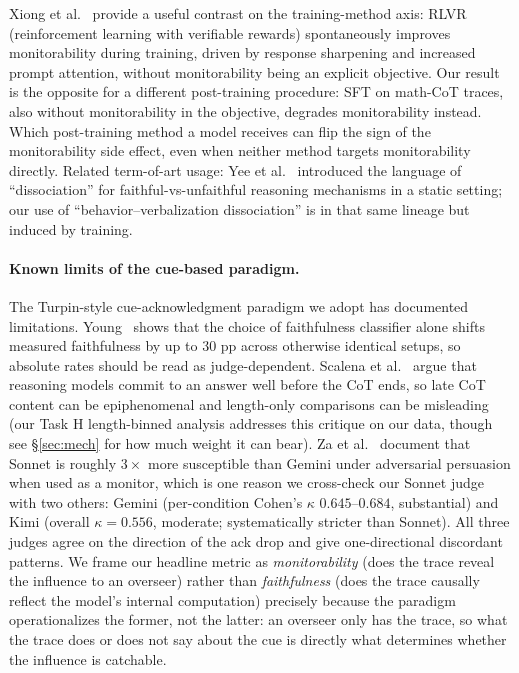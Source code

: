 \documentclass{article}
\begin{document}
Xiong et al.~\cite{xiong2026freegift} provide a useful contrast on the
training-method axis: RLVR (reinforcement learning with verifiable rewards)
spontaneously improves monitorability during training, driven by response
sharpening and increased prompt attention, without monitorability being an
explicit objective. Our result is the opposite for a different post-training
procedure: SFT on math-CoT traces, also without monitorability in the
objective, degrades monitorability instead. Which post-training method a
model receives can flip the sign of the monitorability side effect, even
when neither method targets monitorability directly. Related term-of-art usage:
Yee et al.~\cite{yee2024dissoc} introduced the language of ``dissociation''
for faithful-vs-unfaithful reasoning mechanisms in a static setting; our
use of ``behavior--verbalization dissociation'' is in that same lineage but
induced by training.

\paragraph{Known limits of the cue-based paradigm.}
The Turpin-style cue-acknowledgment paradigm we adopt has documented
limitations. Young~\cite{young2026classifier} shows that the choice of
faithfulness classifier alone shifts measured faithfulness by up to $30$ pp
across otherwise identical setups, so absolute rates should be read as
judge-dependent. Scalena et al.~\cite{scalena2026commit} argue that
reasoning models commit to an answer well before the CoT ends, so late CoT
content can be epiphenomenal and length-only comparisons can be misleading
(our Task H length-binned analysis addresses this critique on our data, though
see \S\ref{sec:mech} for how much weight it can bear). Za et al.~\cite{za2026persuasion} document that
Sonnet is roughly $3\times$ more susceptible than Gemini under adversarial
persuasion when used as a monitor, which is one reason we cross-check our
Sonnet judge with two others: Gemini (per-condition Cohen's $\kappa$
$0.645$--$0.684$, substantial) and Kimi (overall $\kappa = 0.556$, moderate; systematically
stricter than Sonnet). All three judges agree on the direction of the ack
drop and give one-directional discordant patterns. We frame our headline metric as \emph{monitorability}
(does the trace reveal the influence to an overseer) rather than
\emph{faithfulness} (does the trace causally reflect the model's internal
computation) precisely because the paradigm operationalizes the former,
not the latter: an overseer only has the trace, so what the trace does or
does not say about the cue is directly what determines whether the
influence is catchable.
\end{document}
